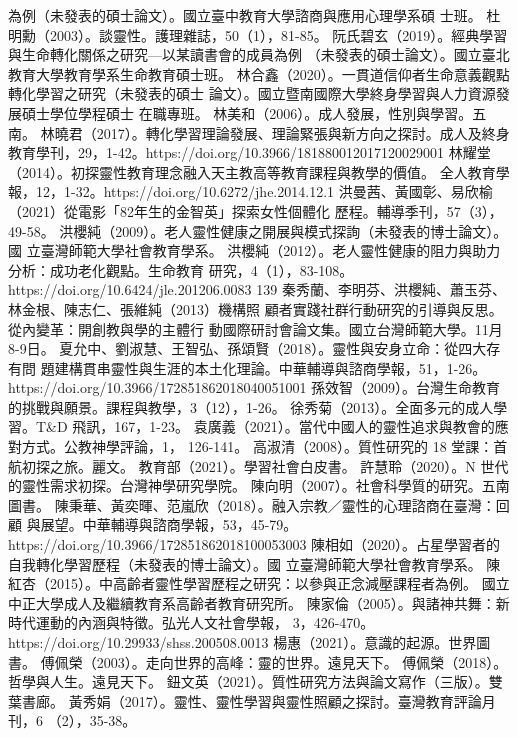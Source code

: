 為例（未發表的碩士論文）。國立臺中教育大學諮商與應用心理學系碩
士班。 
杜明勳（2003）。談靈性。護理雜誌，50（1），81-85。 
阮氏碧玄（2019）。經典學習與生命轉化關係之研究—以某讀書會的成員為例
（未發表的碩士論文）。國立臺北教育大學教育學系生命教育碩士班。 
林合鑫（2020）。一貫道信仰者生命意義觀點轉化學習之研究（未發表的碩士
論文）。國立暨南國際大學終身學習與人力資源發展碩士學位學程碩士
在職專班。 
林美和（2006）。成人發展，性別與學習。五南。 
林曉君（2017）。轉化學習理論發展、理論緊張與新方向之探討。成人及終身
教育學刊，29，1-42。https://doi.org/10.3966/181880012017120029001  
林耀堂（2014）。初探靈性教育理念融入天主教高等教育課程與教學的價值。
全人教育學報，12，1-32。https://doi.org/10.6272/jhe.2014.12.1  
洪曼茜、黃國彰、易欣榆（2021）從電影「82年生的金智英」探索女性個體化
歷程。輔導季刊，57（3），49-58。 
洪櫻純（2009）。老人靈性健康之開展與模式探詢（未發表的博士論文）。國
立臺灣師範大學社會教育學系。 
洪櫻純（2012）。老人靈性健康的阻力與助力分析：成功老化觀點。生命教育
研究，4（1），83-108。https://doi.org/10.6424/jle.201206.0083  
139 
秦秀蘭、李明芬、洪櫻純、蕭玉芬、林金根、陳志仁、張維純（2013）機構照
顧者實踐社群行動研究的引導與反思。從內變革：開創教與學的主體行
動國際研討會論文集。國立台灣師範大學。11月8-9日。 
夏允中、劉淑慧、王智弘、孫頌賢（2018）。靈性與安身立命：從四大存有問
題建構貫串靈性與生涯的本土化理論。中華輔導與諮商學報，51，1-26。
https://doi.org/10.3966/172851862018040051001  
孫效智（2009）。台灣生命教育的挑戰與願景。課程與教學，3（12），1-26。 
徐秀菊（2013）。全面多元的成人學習。T&D 飛訊，167，1-23。 
袁廣義（2021）。當代中國人的靈性追求與教會的應對方式。公教神學評論，1，
126-141。 
高淑清（2008）。質性研究的 18 堂課：首航初探之旅。麗文。 
教育部（2021）。學習社會白皮書。 
許慧聆（2020）。N 世代的靈性需求初探。台灣神學研究學院。 
陳向明（2007）。社會科學質的研究。五南圖書。  
陳秉華、黃奕暉、范嵐欣（2018）。融入宗教／靈性的心理諮商在臺灣：回顧
與展望。中華輔導與諮商學報，53，45-79。
https://doi.org/10.3966/172851862018100053003  
陳相如（2020）。占星學習者的自我轉化學習歷程（未發表的博士論文）。國
立臺灣師範大學社會教育學系。 
陳紅杏（2015）。中高齡者靈性學習歷程之研究：以參與正念減壓課程者為例。
國立中正大學成人及繼續教育系高齡者教育研究所。 
陳家倫（2005）。與諸神共舞：新時代運動的內涵與特徵。弘光人文社會學報，
3，426-470。https://doi.org/10.29933/shss.200508.0013  
楊惠（2021）。意識的起源。世界圖書。 
傅佩榮（2003）。走向世界的高峰：靈的世界。遠見天下。 
傅佩榮（2018）。哲學與人生。遠見天下。 
鈕文英（2021）。質性研究方法與論文寫作（三版）。雙葉書廊。 
黃秀娟（2017）。靈性、靈性學習與靈性照顧之探討。臺灣教育評論月刊，6
（2），35-38。 
